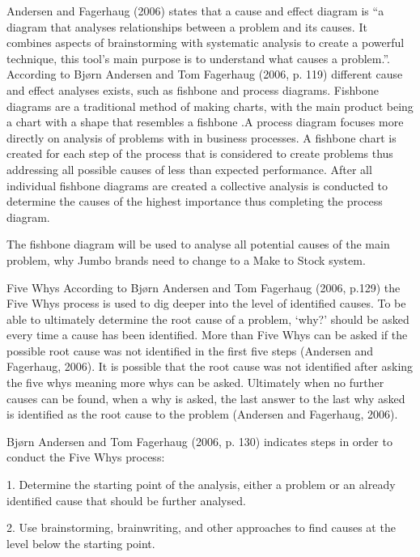 \documentclass[a4paper,11pt,fleqn]{report}
\begin{document}
                Andersen and Fagerhaug (2006) states that a cause and effect diagram is “a diagram that analyses relationships between a problem and its causes. It combines aspects of brainstorming with systematic analysis to create a powerful technique, this tool’s main purpose is to understand what causes a problem.”. According to Bjørn Andersen and Tom Fagerhaug (2006, p. 119) different cause and effect analyses exists, such as fishbone and process diagrams. Fishbone diagrams are a traditional method of making charts, with the main product being a chart with a shape that resembles a fishbone .A process diagram focuses more directly on analysis of problems with in business processes. A fishbone chart is created for each step of the process that is considered to create problems thus addressing all possible causes of less than expected performance. After all individual fishbone diagrams are created a collective analysis is conducted to determine the causes of the highest importance thus completing the process diagram.
                
                The fishbone diagram will be used to analyse all potential causes of the main problem, why Jumbo brands need to change to a Make to Stock system.
                
            Five Whys
                According to Bjørn Andersen and Tom Fagerhaug (2006, p.129) the Five Whys process is used to dig deeper into the level of identified causes. To be able to ultimately determine the root cause of a problem, ‘why?’ should be asked every time a cause has been identified. More than Five Whys can be asked if the possible root cause was not identified in the first five steps (Andersen and Fagerhaug, 2006). It is possible that the root cause was not identified after asking the five whys meaning more whys can be asked. Ultimately when no further causes can be found, when a why is asked, the last answer to the last why asked is identified as the root cause to the problem (Andersen and Fagerhaug, 2006).
                
                Bjørn Andersen and Tom Fagerhaug (2006, p. 130) indicates steps in order to conduct the Five Whys process:
                
                1. Determine the starting point of the analysis, either a problem or an already identified cause that should be further analysed.
                
                2. Use brainstorming, brainwriting, and other approaches to find causes at the level below the starting point.
                
\end{document}
